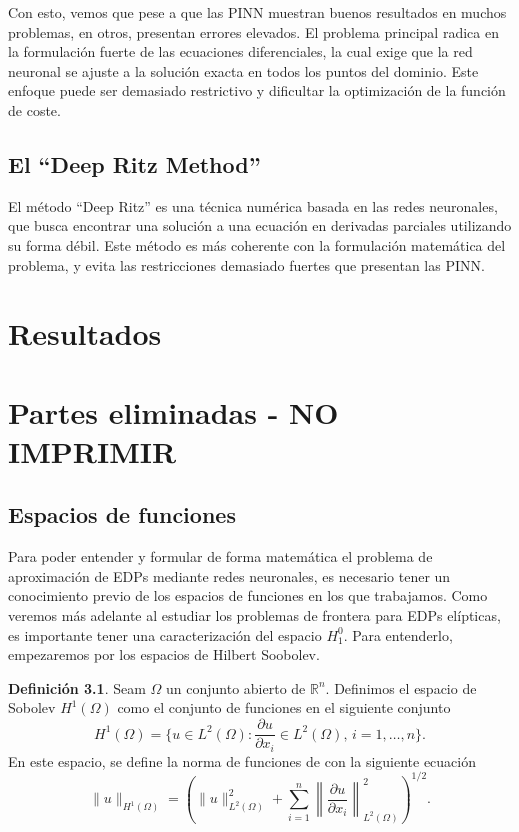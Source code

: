 \documentclass[a4paper,11pt,spanish, twoside, leqno]{tfg-uam}
\theoremstyle{definition}
\newtheorem{defin}[teor]{Definici\'on}
\begin{document}
Con esto, vemos que pese a que las PINN muestran buenos resultados en muchos problemas, en otros, presentan errores elevados. El problema principal radica en la formulación fuerte de las ecuaciones diferenciales, la cual exige que la red neuronal se ajuste a la solución exacta en todos los puntos del dominio. Este enfoque puede ser demasiado restrictivo y dificultar la optimización de la función de coste. 



\section{El ``Deep Ritz Method''}

El método ``Deep Ritz'' es una técnica numérica basada en las redes neuronales, que busca encontrar una solución a una ecuación en derivadas parciales utilizando su forma débil. Este método es más coherente con la formulación matemática del problema, y evita las restricciones demasiado fuertes que presentan las PINN.

\chapter{Resultados}\label{chap3}

\chapter{Partes eliminadas - NO IMPRIMIR}
\section{Espacios de funciones}

Para poder entender y formular de forma matemática el problema de aproximación de EDPs mediante redes neuronales, es necesario tener un conocimiento previo de los espacios de funciones en los que trabajamos. Como veremos más adelante al estudiar los problemas de frontera para EDPs elípticas, es importante tener una caracterización del espacio $H_1^0$. Para entenderlo, empezaremos por los espacios de Hilbert Soobolev.

\begin{mdframed}
\begin{defin}
    Seam $\Omega$ un conjunto abierto de $\mathbb{R}^n$. Definimos el espacio de Sobolev $H^1(\Omega)$ como el conjunto de funciones en el siguiente conjunto
    \begin{equation}
        H^1(\Omega)=\{u\in L^2(\Omega): \frac{\partial u}{\partial x_i}\in L^2(\Omega), \, i=1,\dots,n\}.
    \end{equation}
    En este espacio, se define la norma de funciones de con la siguiente ecuación
    \begin{equation}
        \|u\|_{H^1(\Omega)}=\left(\|u\|^2_{L^2(\Omega)} + \sum_{i=1}^{n}\left\|\frac{\partial u}{\partial x_i}\right\|^2_{L^2(\Omega)}\right)^{1/2}.
    \end{equation}
\end{defin}
\end{mdframed}
\end{document}
